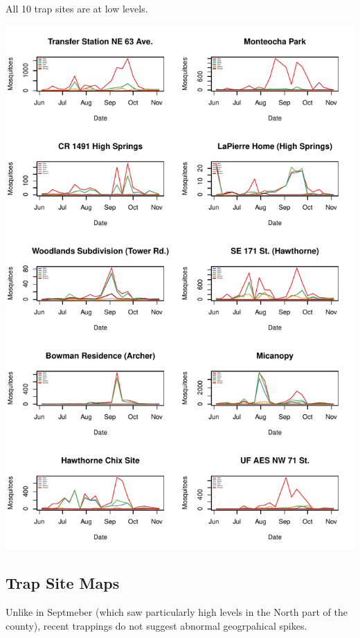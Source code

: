 \documentclass{article}
\begin{document}
All 10 trap sites are at low levels.
\begin{center}
\includegraphics{mosq04nov13-006}
\end{center}
\newpage

\begin{center}
\section*{Trap Site Maps}

\end{center}

Unlike in Septmeber (which saw particularly high levels in the North part of the county), recent trappings do not suggest abnormal geogrpahical spikes.
\end{document}
